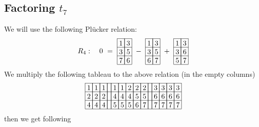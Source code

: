 \subsection{Factoring \(t_7\)}
We will use the following Pl\"{u}cker relation:
\[
R_4:\ \ \ 0\ =\ 
\begin{array}[c]{*{2}c}\cline{1-2}
\lr{1}&\lr{3}\\\cline{1-2}
\lr{3}&\lr{5}\\\cline{1-2}
\lr{7}&\lr{6}\\\cline{1-2}
\end{array}
\ -\ 
\begin{array}[c]{*{2}c}\cline{1-2}
\lr{1}&\lr{3}\\\cline{1-2}
\lr{3}&\lr{5}\\\cline{1-2}
\lr{6}&\lr{7}\\\cline{1-2}
\end{array}
\ +\ 
\begin{array}[c]{*{2}c}\cline{1-2}
\lr{1}&\lr{3}\\\cline{1-2}
\lr{3}&\lr{6}\\\cline{1-2}
\lr{5}&\lr{7}\\\cline{1-2}
\end{array}
\]
We multiply the following tableau to the above relation (in the empty columns)
\[
\begin{array}[b]{*{14}c}\cline{1-14}
\lr{1}&\lr{1}&\lr{1}&\lr{}&\lr{1}&\lr{1}&\lr{2}&\lr{2}&\lr{2}&\lr{}&\lr{3}&\lr{3}&\lr{3}&\lr{3}\\\cline{1-14}
\lr{2}&\lr{2}&\lr{2}&\lr{}&\lr{4}&\lr{4}&\lr{4}&\lr{5}&\lr{5}&\lr{}&\lr{6}&\lr{6}&\lr{6}&\lr{6}\\\cline{1-14}
\lr{4}&\lr{4}&\lr{4}&\lr{}&\lr{5}&\lr{5}&\lr{5}&\lr{6}&\lr{7}&\lr{}&\lr{7}&\lr{7}&\lr{7}&\lr{7}\\\cline{1-14}
\end{array}
\]
then we get following
